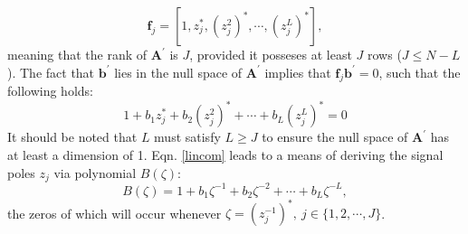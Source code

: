 \begin{equation}
  \symbf{f}_j = \left[ 1, z_j^*, \left(z_j^2\right)^*, \cdots, \left(z_j^L\right)^* \right],
\end{equation}
meaning that the rank of $\symbf{A}^{\prime}$ is $J$, provided it posseses at least $J$ rows ($J \leqslant N - L$). The fact that $\symbf{b}^{\prime}$ lies in the null space of $\symbf{A}^{\prime}$ implies that $\symbf{f}_j \symbf{b}^{\prime} = 0$, such that the following holds:
\begin{equation}
  \label{lincom}
  1 + b_1 z_j^* + b_2 \left(z_j^2\right)^* + \cdots + b_L \left(z_j^L\right)^* = 0
\end{equation}
It should be noted that $L$ must satisfy $L \geqslant J$ to ensure the null space of $\symbf{A}^{\prime}$ has at least a dimension of 1.
Eqn. \ref{lincom} leads to a means of deriving the signal poles $z_j$ via polynomial $B(\zeta)$:
\begin{equation}
  B(\zeta) = 1 + b_1 \zeta^{-1} + b_2 \zeta^{-2} + \cdots + b_L \zeta^{-L},
\end{equation}
the zeros of which will occur whenever $\zeta = \left(z_j^{-1}\right)^*,\ j \in \{1, 2, \cdots, J\}$.

